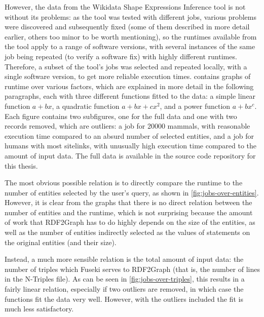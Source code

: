 However, the data from the Wikidata Shape Expressions Inference tool
is not without its problems:
as the tool was tested with different jobs,
various problems were discovered and subsequently fixed
(some of them described in more detail earlier, others too minor to be worth mentioning),
so the runtimes available from the tool apply to a range of software versions,
with several instances of the same job being repeated (to verify a software fix)
with highly different runtimes.
Therefore, a subset of the tool’s jobs was selected
and repeated locally, with a single software version,
to get more reliable execution times. %
 contains graphs of runtime over various factors,
which are explained in more detail in the following paragraphs,
each with three different functions fitted to the data:
a simple linear function $a+bx$,
a quadratic function $a+bx+cx^2$,
and a power function $a+bx^c$.
Each figure contains two subfigures,
one for the full data and one with two records removed, which are outliers:
a job for \num{20000} mammals, with reasonable execution time compared to an absurd number of selected entities, %
and a job for humans with most sitelinks, with unusually high execution time compared to the amount of input data. %
The full data is available in the source code repository for this thesis.

The most obvious possible relation is
to directly compare the runtime to the number of entities selected by the user’s query,
as shown in \cref{fig:jobs-over-entities}.
However, it is clear from the graphs that there is no direct relation
between the number of entities and the runtime,
which is not surprising because the amount of work that RDF2Graph has to do
highly depends on the size of the entities,
as well as the number of entities indirectly selected as the values of statements on the original entities (and their size).

Instead, a much more sensible relation is the total amount of input data:
the number of triples which Fuseki serves to RDF2Graph
(that is, the number of lines in the N-Triples file). %
As can be seen in \cref{fig:jobs-over-triples},
this results in a fairly linear relation,
especially if two outliers are removed,
in which case the functions fit the data very well.
However, with the outliers included the fit is much less satisfactory.

